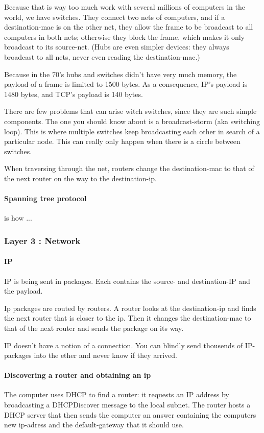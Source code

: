 Because that is way too much work with several millions of computers in the world, we have switches. They connect two nets of computers, and if a destination-mac is on the other net, they allow the frame to be broadcast to all computers in both nets; otherwise they block the frame, which makes it only broadcast to its source-net. (Hubs are even simpler devices: they always broadcast to all nets, never even reading the destination-mac.)

Because in the 70's hubs and switches didn't have very much memory, the payload of a frame is limited to 1500 bytes. As a consequence, IP's payload is 1480 bytes, and TCP's payload is 140 bytes.

There are few problems that can arise witch switches, since they are such simple components. The one you should know about is a broadcast-storm (aka switching loop). This is where multiple switches keep broadcasting each other in search of a particular node. This can really only happen when there is a circle between switches. 

When traversing through the net, routers change the destination-mac to that of the next router on the way to the destination-ip.

\paragraph{Spanning tree protocol} is how ...

\subsubsection{Layer 3 : Network}

\paragraph{IP} 

IP is being sent in packages. Each contains the source- and destination-IP and the payload.

Ip packages are routed by routers. A router looks at the destination-ip and finds the next router that is closer to the ip. Then it changes the destination-mac to that of the next router and sends the package on its way.

IP doesn't have a notion of a connection. You can blindly send thousends of IP-packages into the ether and never know if they arrived. 

\paragraph{Discovering a router and obtaining an ip} The computer uses DHCP to find a router: it requests an IP address by broadcasting a DHCPDiscover message to the local subnet. The router hosts a DHCP server that then sends the computer an answer containing the computers new ip-adress and the default-gateway that it should use. 

